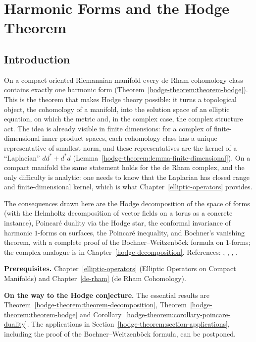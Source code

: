 \chapter{Harmonic Forms and the Hodge Theorem}\label{hodge-theorem}

\section{Introduction}\label{hodge-theorem:section-introduction}

On a compact oriented Riemannian manifold every de Rham cohomology class contains exactly one harmonic form
(Theorem~\ref{hodge-theorem:theorem-hodge}). This is the theorem that makes Hodge theory possible: it turns a topological object,
the cohomology of a manifold, into the solution space of an elliptic equation, on which the metric and, in the complex case, the
complex structure act. The idea is already visible in finite dimensions: for a complex of finite-dimensional inner product spaces, each cohomology class has a unique representative of
smallest norm, and these representatives are the kernel of a ``Laplacian'' $dd^* + d^*d$ (Lemma~\ref{hodge-theorem:lemma-finite-dimensional}). On a compact manifold the same statement holds for
the de Rham complex, and the only difficulty is analytic: one needs to know that the Laplacian has closed range and finite-dimensional kernel, which is what
Chapter~\ref{elliptic-operators} provides.

The consequences drawn here are the Hodge decomposition of the space of forms (with the Helmholtz decomposition of vector fields on a torus as a concrete instance), Poincar\'e duality via the
Hodge star, the conformal invariance of harmonic $1$-forms on surfaces, the Poincar\'e inequality, and Bochner's vanishing theorem, with a complete proof of the Bochner--Weitzenb\"ock formula on
$1$-forms; the complex analogue is in Chapter~\ref{hodge-decomposition}. References: \cite[Chapter 6]{warner-foundations}, \cite[Chapter 4]{wells-differential-analysis},
\cite[Chapter 0]{griffiths-harris}, \cite[Chapter 5]{voisin-hodge-1}.

\noindent\textbf{Prerequisites.} Chapter~\ref{elliptic-operators} (Elliptic Operators on Compact Manifolds) and
Chapter~\ref{de-rham} (de Rham Cohomology).

\noindent\textbf{On the way to the Hodge conjecture.} The essential results are Theorem~\ref{hodge-theorem:theorem-decomposition}, Theorem~\ref{hodge-theorem:theorem-hodge} and
Corollary~\ref{hodge-theorem:corollary-poincare-duality}. The applications in Section~\ref{hodge-theorem:section-applications}, including the proof of the Bochner--Weitzenb\"ock formula, can be postponed.

